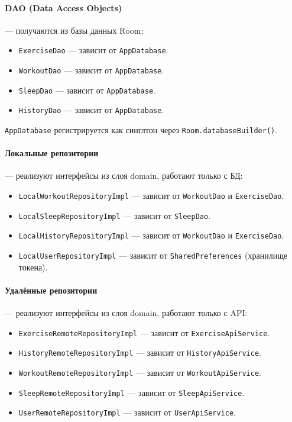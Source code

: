 \paragraph{DAO (Data Access Objects)} — получаются из базы данных Room:
\begin{itemize}
    \item \texttt{ExerciseDao} — зависит от \texttt{AppDatabase}.
    \item \texttt{WorkoutDao} — зависит от \texttt{AppDatabase}.
    \item \texttt{SleepDao} — зависит от \texttt{AppDatabase}.
    \item \texttt{HistoryDao} — зависит от \texttt{AppDatabase}.
\end{itemize}
\texttt{AppDatabase} регистрируется как синглтон через \texttt{Room.databaseBuilder()}.

\paragraph{Локальные репозитории} — реализуют интерфейсы из слоя domain, работают только с БД:
\begin{itemize}
    \item \texttt{LocalWorkoutRepositoryImpl} — зависит от \texttt{WorkoutDao} и \texttt{ExerciseDao}.
    \item \texttt{LocalSleepRepositoryImpl} — зависит от \texttt{SleepDao}.
    \item \texttt{LocalHistoryRepositoryImpl} — зависит от \texttt{WorkoutDao} и \texttt{ExerciseDao}.
    \item \texttt{LocalUserRepositoryImpl} — зависит от \texttt{SharedPreferences} (хранилище токена).
\end{itemize}

\paragraph{Удалённые репозитории} — реализуют интерфейсы из слоя domain, работают только с API:
\begin{itemize}
    \item \texttt{ExerciseRemoteRepositoryImpl} — зависит от \texttt{ExerciseApiService}.
    \item \texttt{HistoryRemoteRepositoryImpl} — зависит от \texttt{HistoryApiService}.
    \item \texttt{WorkoutRemoteRepositoryImpl} — зависит от \texttt{WorkoutApiService}.
    \item \texttt{SleepRemoteRepositoryImpl} — зависит от \texttt{SleepApiService}.
    \item \texttt{UserRemoteRepositoryImpl} — зависит от \texttt{UserApiService}.
\end{itemize}


